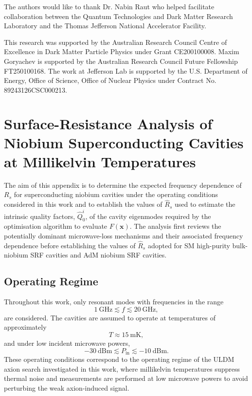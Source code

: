 \documentclass[
  aps,
  physrev,
  reprint,
  superscriptaddress,
  nofootinbib,
  amsmath,
  amssymb
]{revtex4-2}
\begin{document}
\begin{acknowledgements}
The authors would like to thank Dr. Nabin Raut who helped facilitate collaboration between the Quantum Technologies and Dark Matter Research Laboratory and the Thomas Jefferson National Accelerator Facility.

This research was supported by the Australian Research Council Centre of Excellence in Dark Matter Particle Physics under Grant CE200100008. Maxim Goryachev is supported by the Australian Research Council Future Fellowship FT250100168. The work at Jefferson Lab is supported by the U.S. Department of Energy, Office of Science, Office of Nuclear Physics under Contract No. 89243126CSC000213.
\end{acknowledgements}

\appendix

\section[\appendixname~\thesection]{Surface-Resistance Analysis of Niobium Superconducting Cavities at Millikelvin Temperatures}
\label{app:Rs_analysis}

The aim of this appendix is to determine the expected frequency dependence of $R_s$ for superconducting niobium cavities under the operating conditions considered in this work and to establish the values of $\hat R_s$ used to estimate the intrinsic quality factors, $\hat Q_0^i$, of the cavity eigenmodes required by the optimisation algorithm to evaluate $F(\mathbf{x})$. The analysis first reviews the potentially dominant microwave-loss mechanisms and their associated frequency dependence before establishing the values of $\hat R_s$ adopted for SM high-purity bulk-niobium SRF cavities and AdM niobium SRF cavities.

\subsection[\appendixname~\thesubsection]{Operating Regime}
\label{app:Rs_operating_regime}

Throughout this work, only resonant modes with frequencies in the range
\begin{equation}
    1~\mathrm{GHz}\lesssim f\lesssim20~\mathrm{GHz},
    \label{eqn:freq_range}
\end{equation}
are considered. The cavities are assumed to operate at temperatures of approximately
\begin{equation}
    T\approx15~\mathrm{mK},
    \label{eq:temp_range}
\end{equation}
and under low incident microwave powers,
\begin{equation}
    -30~\mathrm{dBm}\lesssim P_{\mathrm{in}}\lesssim-10~\mathrm{dBm}.
    \label{eq:power_range}
\end{equation}
These operating conditions correspond to the operating regime of the ULDM axion search investigated in this work, where millikelvin temperatures suppress thermal noise and measurements are performed at low microwave powers to avoid perturbing the weak axion-induced signal.
\end{document}
